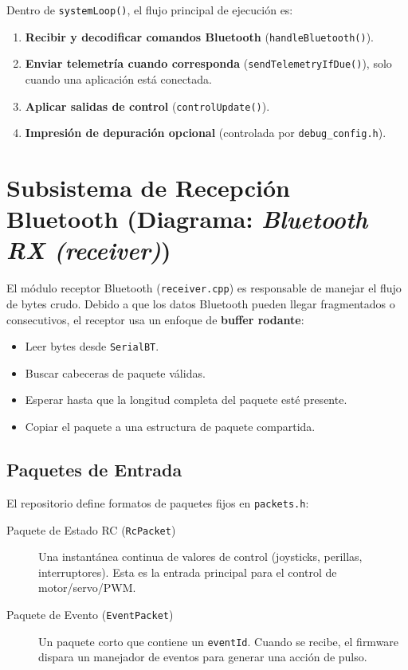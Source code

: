 Dentro de \texttt{systemLoop()}, el flujo principal de ejecución es:

\begin{enumerate}
    \item \textbf{Recibir y decodificar comandos Bluetooth} (\texttt{handleBluetooth()}).
    \item \textbf{Enviar telemetría cuando corresponda} (\texttt{sendTelemetryIfDue()}), solo cuando una aplicación está conectada.
    \item \textbf{Aplicar salidas de control} (\texttt{controlUpdate()}).
    \item \textbf{Impresión de depuración opcional} (controlada por \texttt{debug\_config.h}).
\end{enumerate}

\section{Subsistema de Recepción Bluetooth (Diagrama: \textit{Bluetooth RX (receiver)})}

El módulo receptor Bluetooth (\texttt{receiver.cpp}) es responsable de manejar el flujo de bytes crudo.
Debido a que los datos Bluetooth pueden llegar fragmentados o consecutivos, el receptor usa un enfoque de \textbf{buffer rodante}:

\begin{itemize}
    \item Leer bytes desde \texttt{SerialBT}.
    \item Buscar cabeceras de paquete válidas.
    \item Esperar hasta que la longitud completa del paquete esté presente.
    \item Copiar el paquete a una estructura de paquete compartida.
\end{itemize}

\subsection{Paquetes de Entrada}
El repositorio define formatos de paquetes fijos en \texttt{packets.h}:

\begin{description}
    \item[Paquete de Estado RC (\texttt{RcPacket})] Una instantánea continua de valores de control (joysticks, perillas, interruptores).
    Esta es la entrada principal para el control de motor/servo/PWM.
    \item[Paquete de Evento (\texttt{EventPacket})] Un paquete corto que contiene un \texttt{eventId}.
    Cuando se recibe, el firmware dispara un manejador de eventos para generar una acción de pulso.
\end{description}

